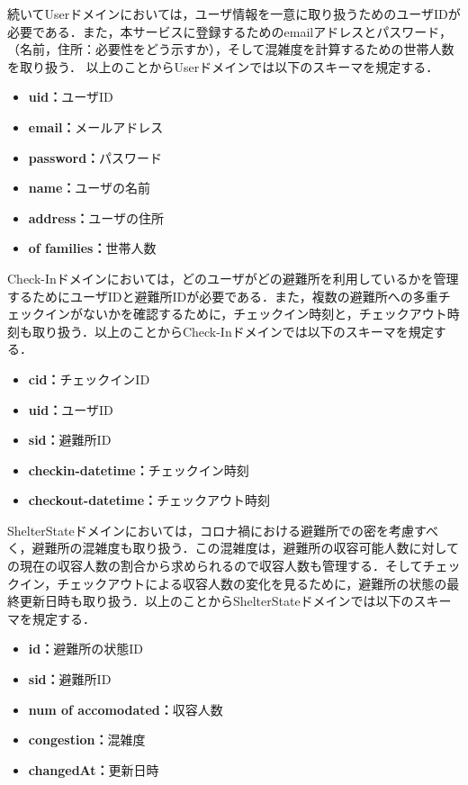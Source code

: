 \documentclass[technicalreport,dvipdfmx]{ieicej}
\begin{document}
続いてUserドメインにおいては，ユーザ情報を一意に取り扱うためのユーザIDが必要である．また，本サービスに登録するためのemailアドレスとパスワード，（名前，住所：必要性をどう示すか），そして混雑度を計算するための世帯人数を取り扱う．%
以上のことからUserドメインでは以下のスキーマを規定する．

\begin{itemize}
    \item{\textbf{uid：}}ユーザID
    \item{\textbf{email：}}メールアドレス
    \item{\textbf{password：}}パスワード
    \item{\textbf{name：}}ユーザの名前
    \item{\textbf{address：}}ユーザの住所
    \item{\textbf{of families：}}世帯人数
\end{itemize}

Check-Inドメインにおいては，どのユーザがどの避難所を利用しているかを管理するためにユーザIDと避難所IDが必要である．また，複数の避難所への多重チェックインがないかを確認するために，チェックイン時刻と，チェックアウト時刻も取り扱う．以上のことからCheck-Inドメインでは以下のスキーマを規定する．

\begin{itemize}
    \item{\textbf{cid：}}チェックインID
    \item{\textbf{uid：}}ユーザID
    \item{\textbf{sid：}}避難所ID
    \item{\textbf{checkin-datetime：}}チェックイン時刻
    \item{\textbf{checkout-datetime：}}チェックアウト時刻
\end{itemize}

ShelterStateドメインにおいては，コロナ禍における避難所での密を考慮すべく，避難所の混雑度も取り扱う．この混雑度は，避難所の収容可能人数に対しての現在の収容人数の割合から求められるので収容人数も管理する．そしてチェックイン，チェックアウトによる収容人数の変化を見るために，避難所の状態の最終更新日時も取り扱う．以上のことからShelterStateドメインでは以下のスキーマを規定する．

\begin{itemize}
     \item{\textbf{id：}}避難所の状態ID
     \item{\textbf{sid：}}避難所ID
     \item{\textbf{num of accomodated：}}収容人数
     \item{\textbf{congestion：}}混雑度
     \item{\textbf{changedAt：}}更新日時
 \end{itemize}
\end{document}
